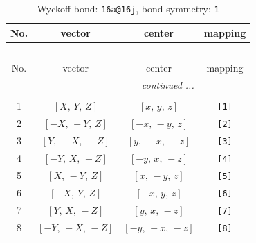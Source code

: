 \documentclass[fleqn,8pt]{jsarticle}
\begin{document}
\begin{longtable}{cccc}
\caption{Wyckoff bond: {\tt 16a@16j}, bond symmetry: {\tt 1}}
 \\
 \hline \hline
No. & vector & center & mapping \\ \hline \endfirsthead

\multicolumn{3}{l}{\tablename\ \thetable{}} \\
 \hline \hline
No. & vector & center & mapping \\ \hline \endhead

 \hline \hline
\multicolumn{3}{r}{\footnotesize\it continued ...} \\ \endfoot

 \hline \hline
\multicolumn{3}{r}{} \\ \endlastfoot

1 & $\left[ X,\, Y,\, Z \right]$ & $\left[ x,\, y,\, z \right]$ & {\tt [1]} \\ \hline
2 & $\left[ - X,\, - Y,\, Z \right]$ & $\left[ - x,\, - y,\, z \right]$ & {\tt [2]} \\ \hline
3 & $\left[ Y,\, - X,\, - Z \right]$ & $\left[ y,\, - x,\, - z \right]$ & {\tt [3]} \\ \hline
4 & $\left[ - Y,\, X,\, - Z \right]$ & $\left[ - y,\, x,\, - z \right]$ & {\tt [4]} \\ \hline
5 & $\left[ X,\, - Y,\, Z \right]$ & $\left[ x,\, - y,\, z \right]$ & {\tt [5]} \\ \hline
6 & $\left[ - X,\, Y,\, Z \right]$ & $\left[ - x,\, y,\, z \right]$ & {\tt [6]} \\ \hline
7 & $\left[ Y,\, X,\, - Z \right]$ & $\left[ y,\, x,\, - z \right]$ & {\tt [7]} \\ \hline
8 & $\left[ - Y,\, - X,\, - Z \right]$ & $\left[ - y,\, - x,\, - z \right]$ & {\tt [8]} \\
\end{longtable}
\end{document}

